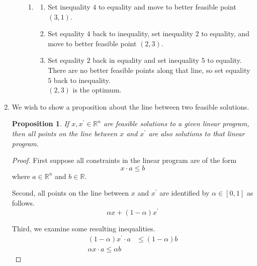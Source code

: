 \documentclass[letterpaper,11pt]{article}
\newtheorem{proposition}{Proposition}
\newcommand{\R}{\mathbb{R}}
\begin{document}
\begin{enumerate}
\begin{enumerate}
\begin{enumerate}
                    \item
                        \begin{enumerate}
                            \item
                                Set inequality $4$ to equality
                                and move to better feasible point $(3, 1)$.
                            \item
                                Set equality $4$ back to inequality,
                                set inequality $2$ to equality,
                                and move to better feasible point $(2, 3)$.
                            \item
                                Set equality $2$ back in equality
                                and set inequality $5$ to equality. \\
                                There are no better feasible points along that
                                line,
                                so set equality $5$ back to inequality. \\
                                $(2, 3)$ is the optimum.
                        \end{enumerate}
                \end{enumerate}
        \end{enumerate}

    \item We wish to show a proposition about the line between two feasible
        solutions.

        \begin{proposition}
            If $x,x^\prime \in \R^n$ are feasible solutions to a given linear
            program, then all points on the line between $x$ and $x^\prime$ are
            also solutions to that linear program.
        \end{proposition}

        \begin{proof}
            First suppose all constraints in the linear program are of the form
            $$
            x \cdot a \leq b
            $$
            where $a \in \R^n$ and $b \in \R$.

            Second, all points on the line between $x$ and $x^\prime$ are identified by
            $\alpha \in [0,1]$ as follows.
            $$
            \alpha x + (1-\alpha)x^\prime
            $$

            Third, we examine some resulting inequalities.
            \begin{align}
                (1 - \alpha)x^\prime \cdot a & \leq (1 - \alpha) b \label{ineq:oneminusalphax} \\
                \alpha x \cdot a \leq \alpha b \label{ineq:alphax}
            \end{align}


\end{proof}
\end{enumerate}
\end{document}
